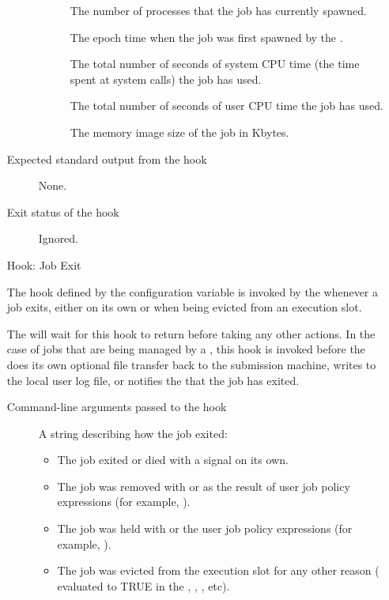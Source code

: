 \begin{itemize}
\begin{description}
\begin{description}
\item[]
  The number of processes that the job has currently spawned.

\item[]
  The epoch time when the job was first spawned by the .

\item[]
  The total number of seconds of system CPU time (the time spent at
  system calls) the job has used.

\item[]
  The total number of seconds of user CPU time the job has used.

\item[]
  The memory image size of the job in Kbytes.
\end{description}

\item[Expected standard output from the hook]
  None.

\item[Exit status of the hook]
  Ignored.
\end{description}


\item[Hook:  Job Exit]

The hook defined by the configuration variable
 is invoked by the 
whenever a job exits, either on its
own or when being evicted from an execution slot.

The  will wait for this hook to return before
taking any other actions.
In the case of jobs that are being managed by a , this
hook is invoked before the  does its own optional file
transfer back to the submission machine, writes to the local user log
file, or notifies the  that the job has exited.

\begin{description}
\item[Command-line arguments passed to the hook]
  A string describing how the job exited:
  \begin{itemize}
    \item \verb@exit@ The job exited or died with a signal on its own.
    \item \verb@remove@ The job was removed with  or as the result of
    user job policy expressions (for example, ).
    \item \verb@hold@ The job was held with  or the
    user job policy expressions (for example, ).
    \item \verb@evict@ The job was evicted from the execution slot for
    any other reason ( evaluated to TRUE in the
    , , , etc).
  \end{itemize}


\end{description}
\end{itemize}
